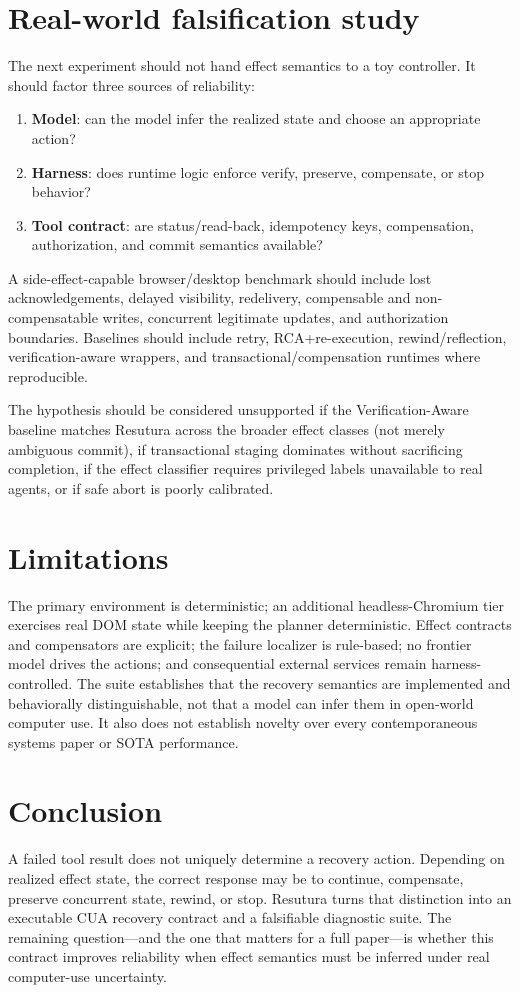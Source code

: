 \documentclass[10pt]{article}
\begin{document}
\section{Real-world falsification study}
The next experiment should not hand effect semantics to a toy controller. It should factor three sources of reliability:

\begin{enumerate}
\item \textbf{Model}: can the model infer the realized state and choose an appropriate action?
\item \textbf{Harness}: does runtime logic enforce verify, preserve, compensate, or stop behavior?
\item \textbf{Tool contract}: are status/read-back, idempotency keys, compensation, authorization, and commit semantics available?
\end{enumerate}

A side-effect-capable browser/desktop benchmark should include lost acknowledgements, delayed visibility, redelivery, compensable and non-compensatable writes, concurrent legitimate updates, and authorization boundaries. Baselines should include retry, RCA+re-execution, rewind/reflection, verification-aware wrappers, and transactional/compensation runtimes where reproducible.

The hypothesis should be considered unsupported if the Verification-Aware baseline matches Resutura across the broader effect classes (not merely ambiguous commit), if transactional staging dominates without sacrificing completion, if the effect classifier requires privileged labels unavailable to real agents, or if safe abort is poorly calibrated.

\section{Limitations}
The primary environment is deterministic; an additional headless-Chromium tier exercises real DOM state while keeping the planner deterministic. Effect contracts and compensators are explicit; the failure localizer is rule-based; no frontier model drives the actions; and consequential external services remain harness-controlled. The suite establishes that the recovery semantics are implemented and behaviorally distinguishable, not that a model can infer them in open-world computer use. It also does not establish novelty over every contemporaneous systems paper or SOTA performance.

\section{Conclusion}
A failed tool result does not uniquely determine a recovery action. Depending on realized effect state, the correct response may be to continue, compensate, preserve concurrent state, rewind, or stop. Resutura turns that distinction into an executable CUA recovery contract and a falsifiable diagnostic suite. The remaining question---and the one that matters for a full paper---is whether this contract improves reliability when effect semantics must be inferred under real computer-use uncertainty.
\end{document}
